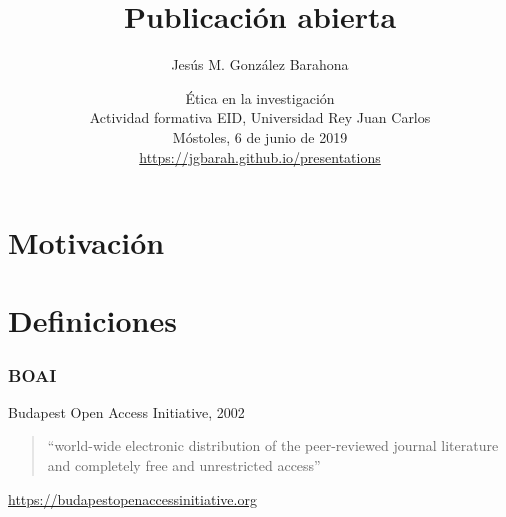 \documentclass[17pt,aspectratio=169]{beamer}
\begin{document}
\title{Publicación abierta}
\author{Jesús M. González Barahona}

\date{Ética en la investigación \\
  Actividad formativa EID, Universidad Rey Juan Carlos \\
  Móstoles, 6 de junio de 2019\\
{\small \url{https://jgbarah.github.io/presentations}} \\}

\frame{
\maketitle
}




\section{Motivación}

\section{Definiciones}


\begin{frame}
\frametitle{BOAI}

Budapest Open Access Initiative, 2002

\vspace{.5cm}

\begin{quote}
  ``world-wide electronic distribution of the peer-reviewed journal literature and completely free and unrestricted access''
\end{quote}

\begin{flushright}
  {\small \url{https://budapestopenaccessinitiative.org}}
\end{flushright}

\end{frame}
\end{document}
